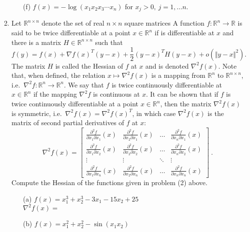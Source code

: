 \documentclass[12pt]{amsart}
\newcommand{\norm}[1]{\Vert #1 \Vert}
\newcommand{\Rn}{\R^n}
\newcommand{\R}{{\mathbb{R}}}
\newcommand{\grad}{\nabla}
\newcommand{\Rnn}{\R^{n\times n}}
\newcommand{\map}[3]{#1:#2\rightarrow #3}
\newcommand{\half}{\frac{1}{2}}
\begin{document}
\begin{enumerate}
\begin{enumerate}
\item[(f)] $f(x)=-\log(x_1x_2x_3\cdots x_n)$ for $x_j>0,\ j=1,\dots n$.\\


\end{enumerate}




\item
Let $\Rnn$ denote the set of real $n\times n$ square matrices
A function $\map{f}{\Rn}{\R}$ is said to be twice differentiable at a point $x\in\Rn$
if is differentiable at $x$ and there is a matrix $H\in\Rnn$ such that
$$f(y)=f(x)+\grad f(x)^T(y-x)+\half (y-x)^TH(y-x)+ o(\norm{y-x}^2).$$
The matrix $H$ is called the Hessian of $f$ at $x$ and is denoted $\grad^2f(x)$.
Note that, when defined, the relation $x\mapsto \grad^2 f(x)$ is
a mapping from $\Rn$ to $\Rnn$, i.e.~$\map{\grad^2 f}{\Rn}{\Rn}$.
We say that $f$ is twice continuously differentiable at $x\in\Rn$ if the mapping
$\grad^2 f$ is continuous at $x$. It can be shown that if $f$ is twice
continuously differentiable at a point $x\in\Rn$, then the matrix
$\grad^2f(x)$ is symmetric, i.e.~$\grad^2f(x)=\grad^2f(x)^T$, in which case
$\grad^2 f(x)$ is the matrix of second partial derivatives of $f$ at $x$:
$$
\grad^2f(x)=\left[\begin{array}{cccc}
\frac{\partial^2 f}{\partial x_1\partial x_1}(x)&
\frac{\partial^2 f}{\partial x_2\partial x_1}(x)&\dots&
\frac{\partial^2 f}{\partial x_n\partial x_1}(x)\\
\frac{\partial^2 f}{\partial x_1\partial x_2}(x)&
\frac{\partial^2 f}{\partial x_2\partial x_2}(x)&\dots&
\frac{\partial^2 f}{\partial x_n\partial x_2}(x)\\
\vdots&\vdots&\ddots&\vdots\\
\frac{\partial^2 f}{\partial x_1\partial x_n}(x)&
\frac{\partial^2 f}{\partial x_2\partial x_n}(x)&\dots&
\frac{\partial^2 f}{\partial x_n\partial x_n}(x)
\end{array}\right]\ .
$$
Compute the Hessian of the functions given in problem (2) above.

\begin{enumerate}
\item[(a)] $f(x)=x_1^3+x_2^3-3x_1-15x_2+25 $\\

$\grad^2 f(x) = $ \\

\item[(b)] $f(x)=x_1^2+x_2^2-\sin(x_1x_2)$ \\


\end{enumerate}
\end{enumerate}
\end{document}
